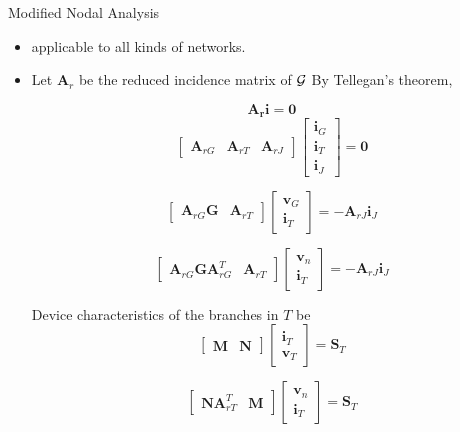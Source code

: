 \documentclass{beamer}
\begin{document}
\begin{frame}
\begin{block}{Modified Nodal Analysis}
\begin{small}
\begin{itemize}
\item applicable to all kinds of networks.
\item Let $\mathbf{A}_{r}$ be the reduced incidence matrix of ${\cal{G}}$
By Tellegan's theorem,
\begin{tiny}
$$\mathbf{A_ri}=\mathbf{0}$$
$$\left[\begin{array}{ccc}
  \mathbf{A}_{rG} & \mathbf{A}_{rT} & \mathbf{A}_{rJ}
\end{array}\right]
\left[\begin{array}{c}
  \mathbf{i}_{G} \\
  \mathbf{i}_{T} \\
  \mathbf{i}_{J}
\end{array}\right]
=\mathbf{0}$$

$$\left[\begin{array}{cc}
  \mathbf{A}_{rG}\mathbf{G} & \mathbf{A}_{rT}
\end{array}\right]
\left[\begin{array}{c}
  \mathbf{v}_{G} \\
  \mathbf{i}_{T}
\end{array}\right]
=-\mathbf{A}_{rJ}\mathbf{i}_{J}$$

\begin{equation}
\label{mna_eq1}
\left[\begin{array}{cc}
  \mathbf{A}_{rG}\mathbf{G}\mathbf{A}_{rG}^{T} & \mathbf{A}_{rT}
\end{array}\right]
\left[\begin{array}{c}
  \mathbf{v}_{n} \\
  \mathbf{i}_{T}
\end{array}\right]
=-\mathbf{A}_{rJ}\mathbf{i}_{J}
\end{equation}

Device characteristics of the branches in $T$ be
$$\left[\begin{array}{cc}
  \mathbf{M} & \mathbf{N}
\end{array}\right]
\left[\begin{array}{c}
  \mathbf{i}_{T} \\
  \mathbf{v}_{T}
\end{array}\right]
=\mathbf{S}_{T}$$

\begin{equation}
\label{mna_eq2}
\left[\begin{array}{cc}
  \mathbf{NA}_{rT}^{T} & \mathbf{M}
\end{array}\right]
\left[\begin{array}{c}
  \mathbf{v}_{n} \\
  \mathbf{i}_{T}
\end{array}\right]
=\mathbf{S}_{T}
\end{equation}
\end{tiny}
\end{itemize}
\end{small}
\end{block}
\end{frame}
\end{document}
